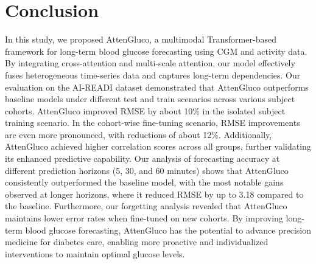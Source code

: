 \section{Conclusion}
In this study, we proposed AttenGluco, a multimodal Transformer-based framework for long-term blood glucose forecasting using CGM and activity data. By integrating cross-attention and multi-scale attention, our model effectively fuses heterogeneous time-series data and captures long-term dependencies. Our evaluation on the AI-READI dataset demonstrated that AttenGluco outperforms baseline models under different test and train scenarios across various subject cohorts. AttenGluco improved RMSE by about 10\% in the isolated subject training scenario. In the cohort-wise fine-tuning scenario, RMSE improvements are even more pronounced, with reductions of about 12\%. Additionally, AttenGluco achieved higher correlation scores across all groups, further validating its enhanced predictive capability. Our analysis of forecasting accuracy at different prediction horizons (5, 30, and 60 minutes) shows that AttenGluco consistently outperformed the baseline model, with the most notable gains observed at longer horizons, where it reduced RMSE by up to 3.18 compared to the baseline. Furthermore, our forgetting analysis revealed that AttenGluco maintains lower error rates when fine-tuned on new cohorts. By improving long-term blood glucose forecasting, AttenGluco has the potential to advance precision medicine for diabetes care, enabling more proactive and individualized interventions to maintain optimal glucose levels.

